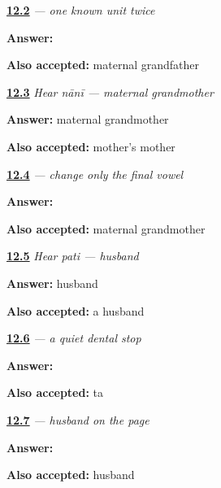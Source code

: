 \noindent\begin{minipage}[t]{\linewidth}
\raggedright
\hyperlink{review-MW-C09-nana-dictation}{\textbf{12.2}} \emph{ — one known unit twice}\par
\small \textbf{Answer:} \par
\footnotesize \textbf{Also accepted:}  maternal grandfather
\end{minipage}\par\medskip

\noindent\begin{minipage}[t]{\linewidth}
\raggedright
\hyperlink{review-MW-C09-hear-nani-meaning}{\textbf{12.3}} \emph{Hear \emph{nānī} — maternal grandmother}\par
\small \textbf{Answer:} maternal grandmother\par
\footnotesize \textbf{Also accepted:} mother's mother
\end{minipage}\par\medskip

\noindent\begin{minipage}[t]{\linewidth}
\raggedright
\hyperlink{review-MW-C09-nani-dictation}{\textbf{12.4}} \emph{ — change only the final vowel}\par
\small \textbf{Answer:} \par
\footnotesize \textbf{Also accepted:}  maternal grandmother
\end{minipage}\par\medskip

\noindent\begin{minipage}[t]{\linewidth}
\raggedright
\hyperlink{review-MW-C09-hear-pati-meaning}{\textbf{12.5}} \emph{Hear \emph{pati} — husband}\par
\small \textbf{Answer:} husband\par
\footnotesize \textbf{Also accepted:} a husband
\end{minipage}\par\medskip

\noindent\begin{minipage}[t]{\linewidth}
\raggedright
\hyperlink{review-MW-W09-ta-write}{\textbf{12.6}} \emph{ — a quiet dental stop}\par
\small \textbf{Answer:} \par
\footnotesize \textbf{Also accepted:}  ta
\end{minipage}\par\medskip

\noindent\begin{minipage}[t]{\linewidth}
\raggedright
\hyperlink{review-MW-C09-pati-dictation}{\textbf{12.7}} \emph{ — husband on the page}\par
\small \textbf{Answer:} \par
\footnotesize \textbf{Also accepted:}  husband
\end{minipage}\par\medskip


